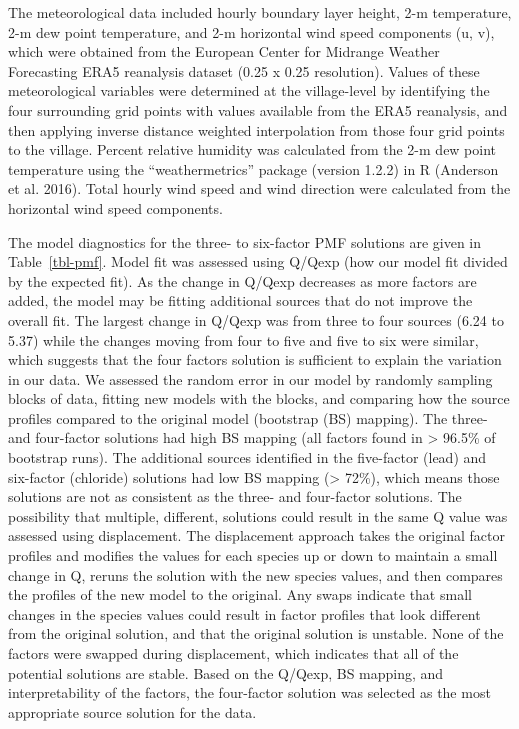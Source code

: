 \documentclass[
  letterpaper,
  DIV=11,
  numbers=noendperiod]{scrartcl}
\begin{document}
The meteorological data included hourly boundary layer height, 2-m
temperature, 2-m dew point temperature, and 2-m horizontal wind speed
components (u, v), which were obtained from the European Center for
Midrange Weather Forecasting ERA5 reanalysis dataset (0.25 x 0.25
resolution). Values of these meteorological variables were determined at
the village-level by identifying the four surrounding grid points with
values available from the ERA5 reanalysis, and then applying inverse
distance weighted interpolation from those four grid points to the
village. Percent relative humidity was calculated from the 2-m dew point
temperature using the ``weathermetrics'' package (version 1.2.2) in R
(Anderson et al. 2016). Total hourly wind speed and wind direction were
calculated from the horizontal wind speed components.

The model diagnostics for the three- to six-factor PMF solutions are
given in Table~\ref{tbl-pmf}. Model fit was assessed using Q/Qexp (how
our model fit divided by the expected fit). As the change in Q/Qexp
decreases as more factors are added, the model may be fitting additional
sources that do not improve the overall fit. The largest change in
Q/Qexp was from three to four sources (6.24 to 5.37) while the changes
moving from four to five and five to six were similar, which suggests
that the four factors solution is sufficient to explain the variation in
our data. We assessed the random error in our model by randomly sampling
blocks of data, fitting new models with the blocks, and comparing how
the source profiles compared to the original model (bootstrap (BS)
mapping). The three- and four-factor solutions had high BS mapping (all
factors found in \textgreater{} 96.5\% of bootstrap runs). The
additional sources identified in the five-factor (lead) and six-factor
(chloride) solutions had low BS mapping (\textgreater{} 72\%), which
means those solutions are not as consistent as the three- and
four-factor solutions. The possibility that multiple, different,
solutions could result in the same Q value was assessed using
displacement. The displacement approach takes the original factor
profiles and modifies the values for each species up or down to maintain
a small change in Q, reruns the solution with the new species values,
and then compares the profiles of the new model to the original. Any
swaps indicate that small changes in the species values could result in
factor profiles that look different from the original solution, and that
the original solution is unstable. None of the factors were swapped
during displacement, which indicates that all of the potential solutions
are stable. Based on the Q/Qexp, BS mapping, and interpretability of the
factors, the four-factor solution was selected as the most appropriate
source solution for the data.
\end{document}
